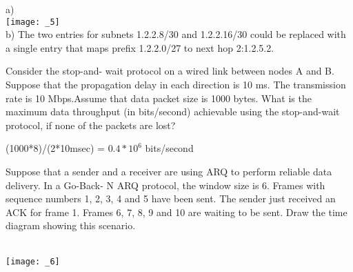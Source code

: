 \documentclass[answers,addpoints]{exam}
\begin{document}
\begin{questions}
\begin{solution}
a) \\
\texttt{[image: \_5]}\\

b) The two entries for subnets 1.2.2.8/30 and 1.2.2.16/30 could be replaced with a single entry that maps prefix 1.2.2.0/27 to next hop 2:1.2.5.2.
\end{solution}

\question
Consider the stop-and- wait protocol on a wired link between nodes A and B. Suppose that the propagation delay in each direction is 10 ms. The transmission rate is 10 Mbps.Assume that data packet size is 1000 bytes.
What is the maximum data throughput (in bits/second) achievable using the stop-and-wait protocol, if none of the packets are lost?
\fillwithdottedlines{0.5in}
\begin{solution}
(1000*8)/(2*10msec) = $0.4*10^6$ bits/second
\end{solution}

\question
Suppose that a sender and a receiver are using ARQ to perform reliable data delivery. In a Go-Back- N ARQ protocol, the window size is 6. Frames with sequence numbers 1, 2, 3, 4 and 5 have been sent. The sender just received an ACK for frame 1. Frames 6, 7, 8, 9 and 10 are waiting to be sent. Draw the time diagram showing this scenario.
\vspace{3in}

\begin{solution}\\
\texttt{[image: \_6]}
\end{solution}


\end{questions}
\end{document}
